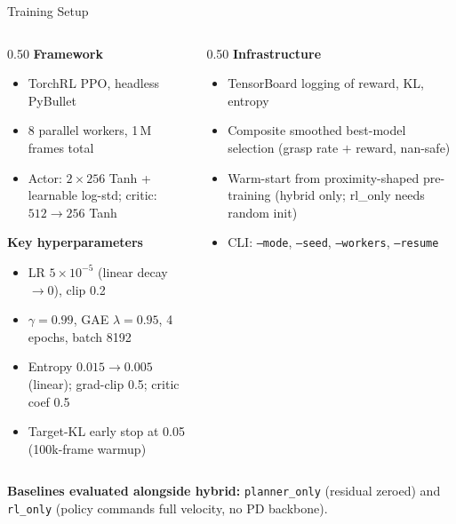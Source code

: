 \documentclass[aspectratio=169, 10pt]{beamer}
\begin{document}
\begin{frame}{Training Setup}
  \small
  \begin{columns}[T]
    \begin{column}{0.50\textwidth}
      \textbf{Framework}
      \begin{itemize}
        \item TorchRL PPO, headless PyBullet
        \item 8 parallel workers, 1\,M frames total
        \item Actor: $2{\times}256$ Tanh + learnable log-std;
              critic: $512{\to}256$ Tanh
      \end{itemize}

      \textbf{Key hyperparameters}
      \begin{itemize}
        \item LR $5\!\times\!10^{-5}$ (linear decay $\to 0$), clip 0.2
        \item $\gamma{=}0.99$, GAE $\lambda{=}0.95$, 4 epochs, batch 8192
        \item Entropy $0.015 \to 0.005$ (linear); grad-clip 0.5; critic coef 0.5
        \item Target-KL early stop at 0.05 (100k-frame warmup)
      \end{itemize}
    \end{column}
    \begin{column}{0.50\textwidth}
      \textbf{Infrastructure}
      \begin{itemize}
        \item TensorBoard logging of reward, KL, entropy
        \item Composite smoothed best-model selection
              (grasp rate $+$ reward, nan-safe)
        \item Warm-start from proximity-shaped pre-training
              (hybrid only; rl\_only needs random init)
        \item CLI: \texttt{--mode}, \texttt{--seed}, \texttt{--workers}, \texttt{--resume}
      \end{itemize}
    \end{column}
  \end{columns}

  \vspace{0.5em}
  \textbf{Baselines evaluated alongside hybrid:}
  \texttt{planner\_only} (residual zeroed) and
  \texttt{rl\_only} (policy commands full velocity, no PD backbone).
\end{frame}
\end{document}
